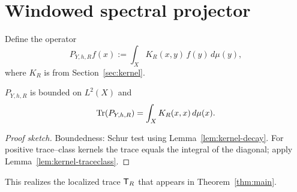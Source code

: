 \section{Windowed spectral projector}\label{sec:projector}

Define the operator
\[
  P_{Y,h,R} f(x) := \int_X K_R(x,y)\,f(y)\,d\mu(y) ,
\]
where $K_R$ is from Section~\ref{sec:kernel}.

\begin{proposition}\label{prop:proj-kernel}
$P_{Y,h,R}$ is bounded on $L^2(X)$ and
\[
  \mathrm{Tr}(P_{Y,h,R}) = \int_X K_R(x,x)\,d\mu(x).
\]
\end{proposition}

\begin{proof}[Proof sketch]
Boundedness: Schur test using Lemma~\ref{lem:kernel-decay}.
For positive trace–class kernels the trace equals the integral of the
diagonal; apply Lemma~\ref{lem:kernel-traceclass}.
\end{proof}

\begin{remark}
This realizes the localized trace $\mathsf{T}_R$ that appears in
Theorem~\ref{thm:main}.
\end{remark}
